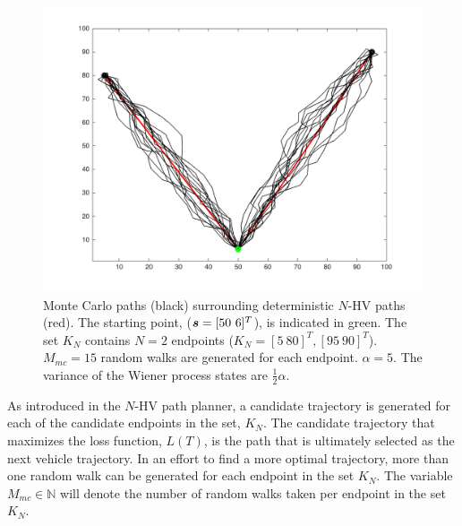 \begin{figure}[hbt!]
	\centering
	\includegraphics[width=0.8\linewidth]{figures/brownian_motion_mc.png}
	\ssp
	\caption{Monte Carlo paths (black) surrounding deterministic $N$-HV paths (red). The starting point, (${\it{\boldsymbol{s}}} = [50 \ 6]^T$), is indicated in green. The set $K_N$ contains $N=2$ endpoints ($K_N = [ 5 \ 80 ]^T, [ 95 \ 90]^T$). $M_{mc}=15$ random walks are generated for each endpoint. $\alpha=5$. The variance of the Wiener process states are $\frac{1}{2} \alpha$.}
\end{figure}

As introduced in the $N$-HV path planner, a candidate trajectory is generated for each of the candidate endpoints in the set, $K_N$. The candidate trajectory that maximizes the loss function, $L(T)$, is the path that is ultimately selected as the next vehicle trajectory. In an effort to find a more optimal trajectory, more than one random walk can be generated for each endpoint in the set $K_N$. The variable $M_{mc} \in \mathbb{N}$ will denote the number of random walks taken per endpoint in the set $K_N$.



